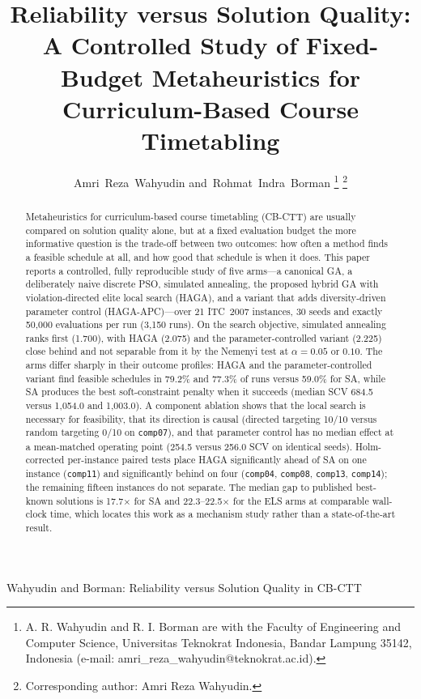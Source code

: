 \documentclass[journal]{IEEEtran}
\newcommand{\code}[1]{\texttt{#1}}
\begin{document}
\title{Reliability versus Solution Quality: A Controlled Study of Fixed-Budget Metaheuristics for Curriculum-Based Course Timetabling}

\author{Amri~Reza~Wahyudin
        and~Rohmat~Indra~Borman%
\thanks{A. R. Wahyudin and R. I. Borman are with the Faculty of Engineering and Computer Science, Universitas Teknokrat Indonesia, Bandar Lampung 35142, Indonesia (e-mail: amri\_reza\_wahyudin@teknokrat.ac.id).}%
\thanks{Corresponding author: Amri Reza Wahyudin.}%
}

%
{Wahyudin and Borman: Reliability versus Solution Quality in CB-CTT}

\maketitle

\begin{abstract}
Metaheuristics for curriculum-based course timetabling (CB-CTT) are usually compared on solution quality alone, but at a fixed evaluation budget the more informative question is the trade-off between two outcomes: how often a method finds a feasible schedule at all, and how good that schedule is when it does. This paper reports a controlled, fully reproducible study of five arms---a canonical GA, a deliberately naive discrete PSO, simulated annealing, the proposed hybrid GA with violation-directed elite local search (HAGA), and a variant that adds diversity-driven parameter control (HAGA-APC)---over 21 ITC~2007 instances, 30 seeds and exactly 50{,}000 evaluations per run (3{,}150 runs). On the search objective, simulated annealing ranks first (1.700), with HAGA (2.075) and the parameter-controlled variant (2.225) close behind and not separable from it by the Nemenyi test at $\alpha=0.05$ or $0.10$. The arms differ sharply in their outcome profiles: HAGA and the parameter-controlled variant find feasible schedules in 79.2\% and 77.3\% of runs versus 59.0\% for SA, while SA produces the best soft-constraint penalty when it succeeds (median SCV 684.5 versus 1{,}054.0 and 1{,}003.0). A component ablation shows that the local search is necessary for feasibility, that its direction is causal (directed targeting 10/10 versus random targeting 0/10 on \code{comp07}), and that parameter control has no median effect at a mean-matched operating point (254.5 versus 256.0 SCV on identical seeds). Holm-corrected per-instance paired tests place HAGA significantly ahead of SA on one instance (\code{comp11}) and significantly behind on four (\code{comp04}, \code{comp08}, \code{comp13}, \code{comp14}); the remaining fifteen instances do not separate. The median gap to published best-known solutions is 17.7$\times$ for SA and 22.3--22.5$\times$ for the ELS arms at comparable wall-clock time, which locates this work as a mechanism study rather than a state-of-the-art result.
\end{abstract}
\end{document}
